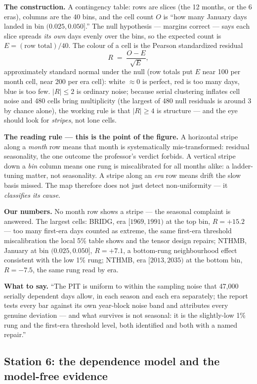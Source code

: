 \documentclass[11pt]{article}
\begin{document}
\textbf{The construction.} A contingency table: rows are slices (the 12
months, or the 6 eras), columns are the 40 bins, and the cell count $O$ is
``how many January days landed in bin $(0.025, 0.050]$.'' The null
hypothesis --- margins correct --- says each slice spreads \emph{its own}
days evenly over the bins, so the expected count is
$E = (\text{row total})/40$. The colour of a cell is the Pearson standardized
residual
\[
R \;=\; \frac{O - E}{\sqrt{E}},
\]
approximately standard normal under the null (row totals put $E$ near 100
per month cell, near 200 per era cell): white $\approx 0$ is perfect, red is
too many days, blue is too few. $|R| \le 2$ is ordinary noise; because
serial clustering inflates cell noise and 480 cells bring multiplicity (the
largest of 480 null residuals is around 3 by chance alone), the working rule
is that $|R| \ge 4$ is structure --- and the eye should look for
\emph{stripes}, not lone cells.

\textbf{The reading rule --- this is the point of the figure.} A horizontal
stripe along a \emph{month} row means that month is systematically
mis-transformed: residual seasonality, the one outcome the professor's
verdict forbids. A vertical stripe down a \emph{bin} column means one rung is
miscalibrated for all months alike: a ladder-tuning matter, not seasonality.
A stripe along an \emph{era} row means drift the slow basis missed. The map
therefore does not just detect non-uniformity --- it \emph{classifies its
cause}.

\textbf{Our numbers.} No month row shows a stripe --- the seasonal complaint
is answered. The largest cells: BRIDG, era $[1969,1991)$ at the top bin,
$R = +15.2$ --- too many first-era days counted as extreme, the same
first-era threshold miscalibration the local 5\% table shows and the tensor
design repairs; NTHMB, January at bin $(0.025, 0.050]$, $R = +7.1$, a
bottom-rung neighbourhood effect consistent with the low 1\% rung; NTHMB,
era $[2013, 2035)$ at the bottom bin, $R = -7.5$, the same rung read by era.

\textbf{What to say.} ``The PIT is uniform to within the sampling noise that
47{,}000 serially dependent days allow, in each season and each era
separately; the report tests every bar against its own year-block noise band
and attributes every genuine deviation --- and what survives is not
seasonal: it is the slightly-low 1\% rung and the first-era threshold level,
both identified and both with a named repair.''

\subsection{Station 6: the dependence model and the model-free evidence}
\label{sec:depclaim}
\end{document}
